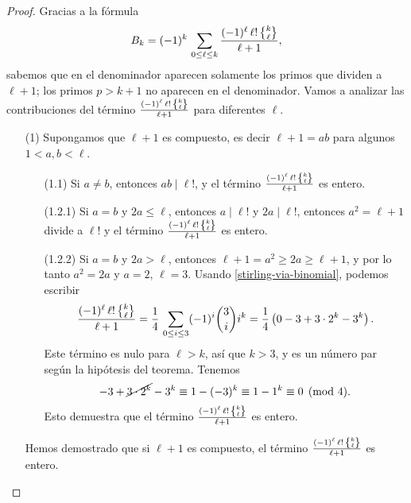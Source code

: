 \documentclass{article}
\numberwithin{equation}{section}
\theoremstyle{definition}
\begin{document}
\begin{proof}
  Gracias a la fórmula
  $$B_k = (-1)^k \, \sum_{0 \le \ell \le k} \frac{(-1)^\ell \, \ell! \, \Stirling{k}{\ell}}{\ell+1},$$
  sabemos que en el denominador aparecen solamente los primos que dividen
  a $\ell + 1$; los primos $p > k+1$ no aparecen en el denominador. Vamos
  a analizar las contribuciones del término
  $\frac{(-1)^\ell \, \ell! \, \Stirling{k}{\ell}}{\ell+1}$ para diferentes
  $\ell$.

  \begin{itemize}
  \item[(1)] Supongamos que $\ell+1$ es compuesto, es decir $\ell+1 = ab$ para
    algunos $1 < a,b < \ell$.

    \begin{itemize}
    \item[(1.1)] Si $a\ne b$, entonces $ab \mid \ell!$, y el término
      $\frac{(-1)^\ell \, \ell! \, \Stirling{k}{\ell}}{\ell+1}$ es entero.

    \item[(1.2.1)] Si $a = b$ y $2a \le \ell$, entonces $a \mid \ell!$ y
      $2a \mid \ell!$, entonces $a^2 = \ell + 1$ divide a $\ell!$ y el término
      $\frac{(-1)^\ell \, \ell! \, \Stirling{k}{\ell}}{\ell+1}$ es entero.

    \item[(1.2.2)] Si $a = b$ y $2a > \ell$, entonces
      $\ell+1 = a^2 \ge 2a \ge \ell + 1$, y por lo tanto $a^2 = 2a$ y $a = 2$,
      $\ell = 3$. Usando \ref{stirling-via-binomial}, podemos escribir
      \[ \frac{(-1)^\ell \, \ell! \, \Stirling{k}{\ell}}{\ell+1} =
        \frac{1}{4}\,\sum_{0 \le i \le 3} (-1)^i {3\choose i} i^k =
        \frac{1}{4} \left(0 - 3 + 3\cdot 2^k - 3^k\right). \]
      Este término es nulo para $\ell > k$, así que $k > 3$, y es un número par
      según la hipótesis del teorema. Tenemos
      $$- 3 + \cancel{3\cdot 2^k} - 3^k \equiv 1 - (-3)^k \equiv 1 - 1^k \equiv 0 \pmod{4}.$$
      Esto demuestra que el término
      $\frac{(-1)^\ell \, \ell! \, \Stirling{k}{\ell}}{\ell+1}$ es entero.
    \end{itemize}

    Hemos demostrado que si $\ell+1$ es compuesto, el término
    $\frac{(-1)^\ell \, \ell! \, \Stirling{k}{\ell}}{\ell+1}$ es entero.


\end{itemize}
\end{proof}
\end{document}
